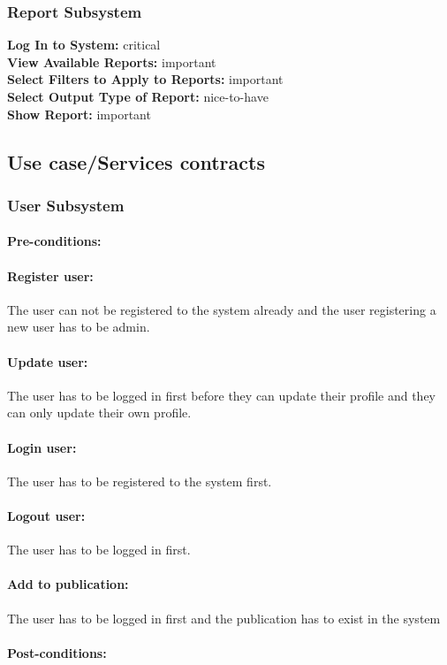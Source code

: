 \documentclass{article}
\begin{document}
			\subsubsection{Report Subsystem}
				\textbf{Log In to System:} critical\\
				\textbf{View Available Reports:} important\\
				\textbf{Select Filters to Apply to Reports:} important\\
				\textbf{Select Output Type of Report:} nice-to-have\\
				\textbf{Show Report:} important\\
		\subsection{Use case/Services contracts}
			\subsubsection{User Subsystem}
				\paragraph{Pre-conditions:}
				\paragraph{Register user:} The user can not be registered to the system already and the user registering a new user has to be admin.
				\paragraph{Update user:} The user has to be logged in first before they can update their profile and they can only update their own profile.
				\paragraph{Login user:} The user has to be registered to the system first.
				\paragraph{Logout user:} The user has to be logged in first.
				\paragraph{Add to publication:} The user has to be logged in first and the publication has to exist in the system
				\paragraph{Post-conditions:}
\end{document}
